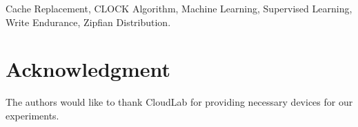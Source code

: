 \documentclass[conference]{IEEEtran}
\begin{document}
\begin{IEEEkeywords}
  Cache Replacement, CLOCK Algorithm, Machine
  Learning, Supervised Learning, Write Endurance, Zipfian Distribution.
\end{IEEEkeywords}






\section*{Acknowledgment}
The authors would like to thank CloudLab for providing necessary
devices for our experiments.

\FloatBarrier


\end{document}
